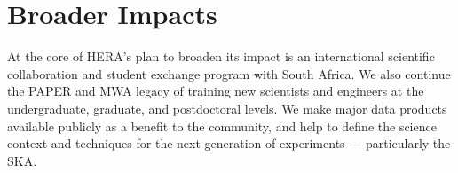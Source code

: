 \documentclass[preprint]{aastex}
\newcommand{\compress}{\vspace{-0.25in}}
\begin{document}


\compress
\section{Broader Impacts} %

At the core
of HERA's plan to broaden its impact
is an international scientific collaboration and student
exchange program with South Africa.  We also continue the PAPER
and MWA legacy of training new scientists and engineers at the undergraduate, graduate,
and postdoctoral levels.  We make major data products
available publicly as a benefit to the community, and help to define the
science context and techniques for the next generation of experiments ---
particularly the SKA.
\end{document}
